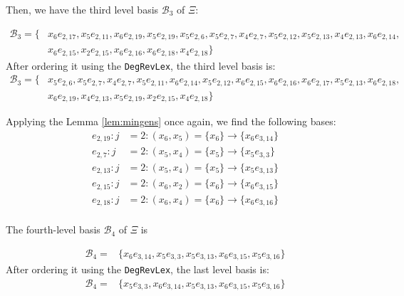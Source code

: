 \documentclass{article}
\theoremstyle{definition}
\theoremstyle{remark}
\theoremstyle{example}
\begin{document}
Then, we have the third level basis $\mathcal{B}_3$ of $\Xi$:

\begin{equation}
    \begin{aligned}
        \mathcal{B}_3 = \{&x_6e_{2,17},x_5e_{2,11},x_6e_{2,19},x_5e_{2,19},x_5e_{2,6},x_5e_{2,7},x_4e_{2,7},x_5e_{2,12},x_5e_{2,13},x_4e_{2,13},x_6e_{2,14},\\
        &x_6e_{2,15},x_2e_{2,15},x_6e_{2,16},x_6e_{2,18},x_4e_{2,18}\}
    \end{aligned}
\end{equation}
After ordering it using the \verb+DegRevLex+, the third level basis is:
\begin{equation}
    \begin{aligned}
        \mathcal{B}_3 = \{&x_5e_{2,6},x_5e_{2,7},x_4e_{2,7},x_5e_{2,11},x_6e_{2,14},x_5e_{2,12},x_6e_{2,15},x_6e_{2,16},x_6e_{2,17},x_5e_{2,13},x_6e_{2,18},\\
        & x_6e_{2,19},x_4e_{2,13},x_5e_{2,19},x_2e_{2,15},x_4e_{2,18}\}
    \end{aligned}
\end{equation}

Applying the Lemma \ref{lem:mingens} once again, we find the following bases:
\begin{align}
    e_{2,19}: j &= 2: (x_6,x_5) = \{x_6\} \rightarrow\{x_6e_{3,14}\}\\
    e_{2,7}: j &= 2: (x_5,x_4) = \{x_5\} \rightarrow\{x_5e_{3,3}\}\\
    e_{2,13}: j &= 2: (x_5,x_4) = \{x_5\} \rightarrow\{x_5e_{3,13}\}\\
    e_{2,15}: j &= 2: (x_6,x_2) = \{x_6\} \rightarrow\{x_6e_{3,15}\}\\
    e_{2,18}: j &= 2: (x_6,x_4) = \{x_6\} \rightarrow\{x_6e_{3,16}\}\\
\end{align}

The fourth-level basis $\mathcal{B}_4$ of $\Xi$ is

\begin{equation}
    \begin{aligned}
        \mathcal{B}_4 = &\{x_6e_{3,14},x_5e_{3,3},x_5e_{3,13},x_6e_{3,15},x_5e_{3,16}\}
    \end{aligned}
\end{equation}
After ordering it using the \verb+DegRevLex+, the last level basis is:
\begin{equation}
    \begin{aligned}
        \mathcal{B}_4 = &\{x_5e_{3,3},x_6e_{3,14},x_5e_{3,13},x_6e_{3,15},x_5e_{3,16}\}
    \end{aligned}
\end{equation}
\end{document}
